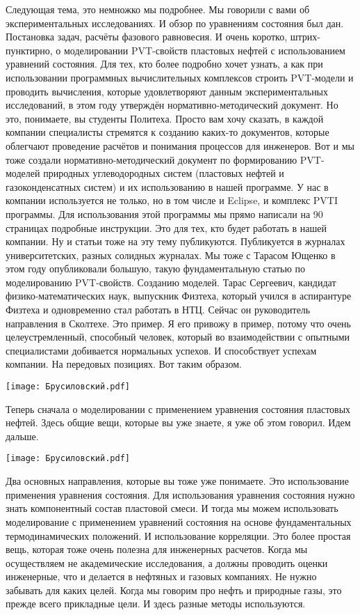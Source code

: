 \documentclass[main.tex]{subfiles}
\begin{document}
Следующая тема, это немножко мы подробнее.
Мы говорили с вами об экспериментальных исследованиях.
И обзор по уравнениям состояния был дан.
Постановка задач, расчёты фазового равновесия.
И очень коротко, штрих-пунктирно, о моделировании PVT-свойств пластовых нефтей с использованием уравнений состояния.
Для тех, кто более подробно хочет узнать, а как при использовании программных вычислительных комплексов строить PVT-модели и проводить вычисления, которые удовлетворяют данным экспериментальных исследований, в этом году утверждён нормативно-методический документ.
Но это, понимаете, вы студенты Политеха.
Просто вам хочу сказать, в каждой компании специалисты стремятся к созданию каких-то документов, которые облегчают проведение расчётов и понимания процессов для инженеров.
Вот и мы тоже создали нормативно-методический документ по формированию PVT-моделей природных углеводородных систем (пластовых нефтей и газоконденсатных систем) и их использованию в нашей программе.
У нас в компании используется не только, но в том числе и Eclipse, и комплекс PVTI программы.
Для использования этой программы мы прямо написали на 90 страницах подробные инструкции.
Это для тех, кто будет работать в нашей компании.
Ну и статьи тоже на эту тему публикуются.
Публикуется в журналах университетских, разных солидных журналах.
Мы тоже с Тарасом Ющенко в этом году опубликовали большую, такую фундаментальную статью по моделированию PVT-свойств.
Созданию моделей.
Тарас Сергеевич, кандидат физико-математических наук, выпускник Физтеха, который учился в аспирантуре Физтеха и одновременно стал работать в НТЦ.
Сейчас он руководитель направления в Сколтехе.
Это пример.
Я его привожу в пример, потому что очень целеустремленный, способный человек, который во взаимодействии с опытными специалистами добивается нормальных успехов.
И способствует успехам компании.
На передовых позициях.
Вот таким образом.

\begin{center}
\texttt{[image: Брусиловский.pdf]}
\end{center}

Теперь сначала о моделировании с применением уравнения состояния пластовых нефтей.
Здесь общие вещи, которые вы уже знаете, я уже об этом говорил.
Идем дальше.

\begin{center}
\texttt{[image: Брусиловский.pdf]}
\end{center}

Два основных направления, которые вы тоже уже понимаете.
Это использование применения уравнения состояния.
Для использования уравнения состояния нужно знать компонентный состав пластовой смеси.
И тогда мы можем использовать моделирование с применением уравнений состояния на основе фундаментальных термодинамических положений.
И использование корреляции.
Это более простая вещь, которая тоже очень полезна для инженерных расчетов.
Когда мы осуществляем не академические исследования, а должны проводить оценки инженерные, что и делается в нефтяных и газовых компаниях.
Не нужно забывать для каких целей.
Когда мы говорим про нефть и природные газы, это прежде всего прикладные цели.
И здесь разные методы используются.
\end{document}
